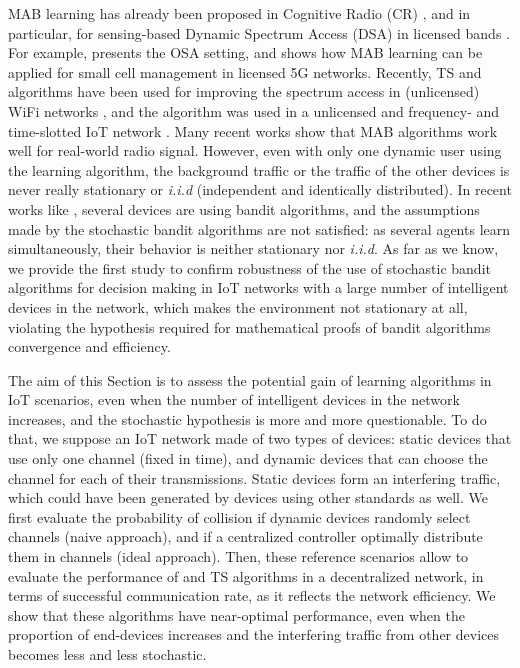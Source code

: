 MAB learning has already been proposed in Cognitive Radio (CR) \cite{Haykin05}, and in particular, for sensing-based Dynamic Spectrum Access (DSA) in licensed bands \cite{Jouini10}.
For example, \cite{Jouini10} presents the OSA setting, and \cite{Maghsudi16} shows how MAB learning can be applied for small cell management in licensed 5G networks.
Recently, TS and \UCB{} algorithms have been used for improving the spectrum access in (unlicensed) WiFi networks \cite{Toldov16}, and the \UCB{} algorithm was used in a unlicensed and frequency- and time-slotted IoT network \cite{Bonnefoi17}.
Many recent works show that MAB algorithms work well for real-world radio signal.
However, even with only one dynamic user using the learning algorithm, the background traffic or the traffic of the other devices is never really stationary or \emph{i.i.d} (independent and identically distributed).
In recent works like \cite{Bonnefoi17}, several devices are using bandit algorithms, and the assumptions made by the stochastic bandit algorithms are not satisfied: as several agents learn simultaneously, their behavior is neither stationary nor \emph{i.i.d}.
As far as we know, we provide the first study to confirm robustness of the use of stochastic bandit algorithms for decision making in IoT networks with a large number of intelligent devices in the network, which makes the environment not stationary at all, violating the hypothesis required for mathematical proofs of bandit algorithms convergence and efficiency.

The aim of this Section is to assess the potential gain of learning algorithms in IoT scenarios, even when the number of intelligent devices in the network increases, and the stochastic hypothesis is more and more questionable.
To do that, we suppose an IoT network made of two types of devices: static devices that use only one channel (fixed in time), and dynamic devices that can choose the channel for each of their transmissions. Static devices form an interfering traffic, which could have been generated by devices using other standards as well.
We first evaluate the probability of collision if dynamic devices randomly select channels (naive approach), and if a centralized controller optimally distribute them in channels (ideal approach).
Then, these reference scenarios allow to evaluate the performance of \UCB{} and TS algorithms in a decentralized network, in terms of successful communication rate, as it reflects the network efficiency.
We show that these algorithms have near-optimal performance, even when the proportion of end-devices increases and the interfering traffic from other devices becomes less and less stochastic.

